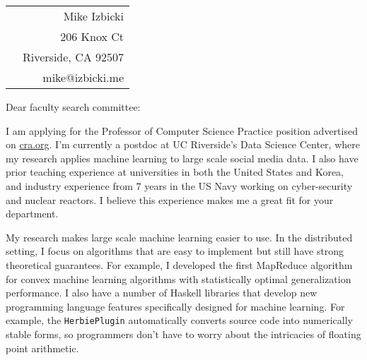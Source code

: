 \documentclass[12pt]{article}
\begin{document}
\noindent
\hspace{-0.13in}
\begin{tabularx}{1.03\textwidth}{Xr}
 & Mike Izbicki \\
 & 206 Knox Ct\\
 & Riverside, CA 92507\\
 & mike@izbicki.me\\
\end{tabularx}

\vspace{0.25in}

\setlength{\parskip}{15pt plus4mm minus3mm}

\noindent
Dear faculty search committee:

\noindent
I am applying for the Professor of Computer Science Practice position advertised on \url{cra.org}.
I'm currently a postdoc at UC Riverside's Data Science Center,
where my research applies machine learning to large scale social media data.
I also have prior teaching experience at universities in both the United States and Korea, and
industry experience from 7 years in the US Navy working on cyber-security and nuclear reactors.
I believe this experience makes me a great fit for your department.

\noindent
My research makes large scale machine learning easier to use.
In the distributed setting, I focus on algorithms that are easy to implement but still have strong theoretical guarantees.
For example, I developed the first MapReduce algorithm for convex machine learning algorithms with statistically optimal generalization performance.
I also have a number of Haskell libraries that develop new programming language features specifically designed for machine learning.
For example, the \texttt{HerbiePlugin} automatically converts source code into numerically stable forms,
so programmers don't have to worry about the intricacies of floating point arithmetic.
\end{document}
